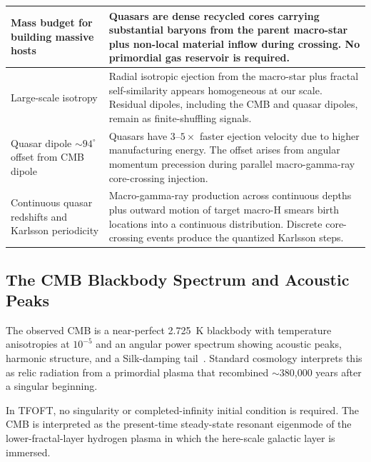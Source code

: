 \documentclass[11pt,a4paper]{article}
\begin{document}
\begin{center}
\begin{longtable}{|L{4.8cm}|L{9.5cm}|}
Mass budget for building massive hosts &
Quasars are dense recycled cores carrying substantial baryons from the parent macro-star plus non-local material inflow during crossing. No primordial gas reservoir is required. \\
\hline

Large-scale isotropy &
Radial isotropic ejection from the macro-star plus fractal self-similarity appears homogeneous at our scale. Residual dipoles, including the CMB and quasar dipoles, remain as finite-shuffling signals. \\
\hline

Quasar dipole \(\sim94^\circ\) offset from CMB dipole &
Quasars have \(3\)--\(5\times\) faster ejection velocity due to higher manufacturing energy. The offset arises from angular momentum precession during parallel macro-gamma-ray core-crossing injection. \\
\hline

Continuous quasar redshifts and Karlsson periodicity &
Macro-gamma-ray production across continuous depths plus outward motion of target macro-H smears birth locations into a continuous distribution. Discrete core-crossing events produce the quantized Karlsson steps. \\
\hline

\end{longtable}
\normalsize
\end{center}



\subsection{The CMB Blackbody Spectrum and Acoustic Peaks}

The observed CMB is a near-perfect 2.725~K blackbody with temperature anisotropies at $10^{-5}$ and an angular power spectrum showing acoustic peaks, harmonic structure, and a Silk-damping tail~\cite{Planck2018VI}. Standard cosmology interprets this as relic radiation from a primordial plasma that recombined $\sim$380,000 years after a singular beginning.

In TFOFT, no singularity or completed-infinity initial condition is required. The CMB is interpreted as the present-time steady-state resonant eigenmode of the lower-fractal-layer hydrogen plasma in which the here-scale galactic layer is immersed.
\end{document}
